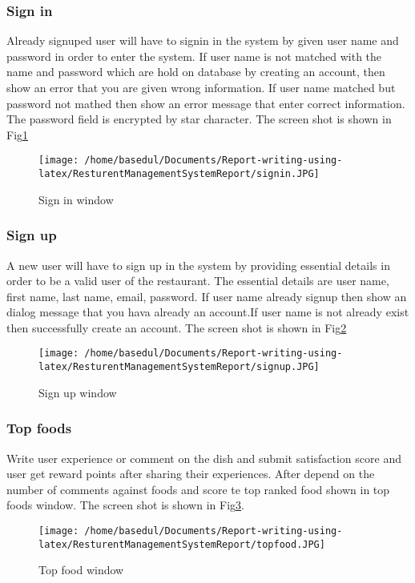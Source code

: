 \documentclass[12pt,a4paper]{article}
\newcommand\tab[1][.7cm]{\hspace*{#1}}
\begin{document}
		\subsubsection{Sign in}
			\tab Already signuped user will have to signin in the system by given user name and password in order to enter the system. If user name is not matched with the name and password which are hold on database by creating an account, then show an error that you are given wrong information. If user name matched but password not mathed then show an error message that enter correct information. The password field is encrypted by star character. The screen shot is shown in Fig\ref{fig:signin} 
			\begin{figure}[H]
		\centering
		\texttt{[image: /home/basedul/Documents/Report-writing-using-latex/ResturentManagementSystemReport/signin.JPG]}
		\caption{\hspace{0.35em}Sign in window}
		\label{fig:signin} 
		\end{figure}
		\subsubsection{Sign up}
			\tab A new user will have to sign up in the system by providing essential details in order to be a valid user of the restaurant. The essential details are user name, first name, last name, email, password. If user name already signup then show an dialog message that you hava already an account.If user name is not already exist then successfully create an account. The screen shot is shown in Fig\ref{fig:signout} 
			\begin{figure}[H]
		\centering
		\texttt{[image: /home/basedul/Documents/Report-writing-using-latex/ResturentManagementSystemReport/signup.JPG]}
		\caption{\hspace{0.35em}Sign up window}
		\label{fig:signout} 
		\end{figure}
		
\subsubsection{Top foods}
			\tab Write user experience or comment on the dish and submit satisfaction score and user get reward points after sharing their experiences. After depend on the number of comments against foods and score te top ranked food shown in top foods window. The screen shot is shown in Fig\ref{fig:topfood}. 
			\begin{figure}[H]
		\centering
		\texttt{[image: /home/basedul/Documents/Report-writing-using-latex/ResturentManagementSystemReport/topfood.JPG]}
		\caption{\hspace{0.35em}Top food window}
		\label{fig:topfood} 
		\end{figure}		
		
\end{document}
